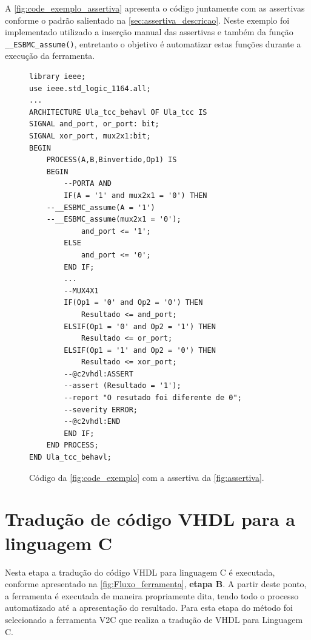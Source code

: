 \par
A \autoref{fig:code_exemplo_assertiva} apresenta o código juntamente com as assertivas conforme o padrão salientado na \autoref{sec:assertiva_descricao}. Neste exemplo foi implementado utilizado a inserção manual das assertivas e também da função \texttt{\_\_ESBMC\_assume()}, entretanto o objetivo é automatizar estas funções durante a execução da ferramenta.

\begin{figure}[H]
\caption{\label{fig:code_exemplo_assertiva} Código da \autoref{fig:code_exemplo} com a assertiva da \autoref{fig:assertiva}.}
	\begin{center}
    \begin{minipage}{0.99\textwidth}
    \begin{lstlisting}       
library ieee;
use ieee.std_logic_1164.all;
...
ARCHITECTURE Ula_tcc_behavl OF Ula_tcc IS
SIGNAL and_port, or_port: bit;
SIGNAL xor_port, mux2x1:bit;
BEGIN
	PROCESS(A,B,Binvertido,Op1) IS
	BEGIN
		--PORTA AND
		IF(A = '1' and mux2x1 = '0') THEN
    --__ESBMC_assume(A = '1')
    --__ESBMC_assume(mux2x1 = '0');
		    and_port <= '1';
		ELSE
		    and_port <= '0';
		END IF;
		...
		--MUX4X1
		IF(Op1 = '0' and Op2 = '0') THEN
			Resultado <= and_port;
		ELSIF(Op1 = '0' and Op2 = '1') THEN
			Resultado <= or_port;
		ELSIF(Op1 = '1' and Op2 = '0') THEN
			Resultado <= xor_port;
        --@c2vhdl:ASSERT
        --assert (Resultado = '1');
        --report "O resutado foi diferente de 0";
        --severity ERROR;
        --@c2vhdl:END
		END IF;
	END PROCESS;
END Ula_tcc_behavl;
    \end{lstlisting}
    \end{minipage}
	\end{center}
\end{figure}
\section{\label{cap:traducao}Tradução de código VHDL para a linguagem C}

\par
Nesta etapa a tradução do código VHDL para linguagem C é executada, conforme apresentado na \autoref{fig:Fluxo_ferramenta}, \textbf{etapa B}. A partir deste ponto, a ferramenta é executada de maneira propriamente dita, tendo todo o processo automatizado até a apresentação do resultado. Para esta etapa do método foi selecionado a ferramenta V2C\cite{albertoV2C} que realiza a tradução de VHDL para Linguagem C.


